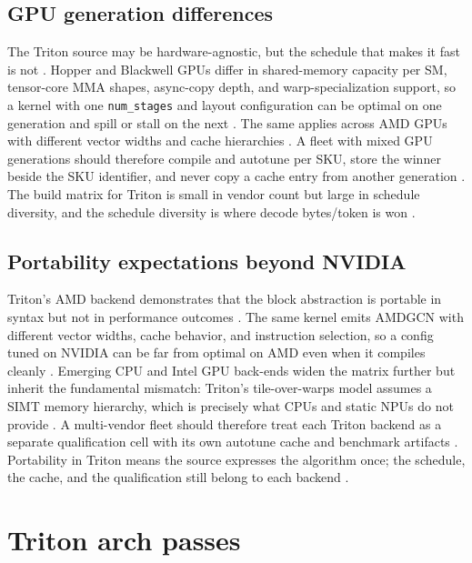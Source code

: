 \subsection{GPU generation differences}

The Triton source may be hardware-agnostic, but the schedule that makes it fast is not \citep{tritonlang2024,nvidia2022hopper}. Hopper and Blackwell GPUs differ in shared-memory capacity per SM, tensor-core MMA shapes, async-copy depth, and warp-specialization support, so a kernel with one \texttt{num\_stages} and layout configuration can be optimal on one generation and spill or stall on the next \citep{semianalysis2024tma,nvidia2022hopper}. The same applies across AMD GPUs with different vector widths and cache hierarchies \citep{tritonlang2024}. A fleet with mixed GPU generations should therefore compile and autotune per SKU, store the winner beside the SKU identifier, and never copy a cache entry from another generation \citep{memoryfloor2026,patel2025llminference}. The build matrix for Triton is small in vendor count but large in schedule diversity, and the schedule diversity is where decode bytes/token is won \citep{taxbreak2026,memoryfloor2026}.

\subsection{Portability expectations beyond NVIDIA}

Triton's AMD backend demonstrates that the block abstraction is portable in syntax but not in performance outcomes \citep{tritonlang2024}. The same kernel emits AMDGCN with different vector widths, cache behavior, and instruction selection, so a config tuned on NVIDIA can be far from optimal on AMD even when it compiles cleanly \citep{tritonlang2024,dlbook}. Emerging CPU and Intel GPU back-ends widen the matrix further but inherit the fundamental mismatch: Triton's tile-over-warps model assumes a SIMT memory hierarchy, which is precisely what CPUs and static NPUs do not provide \citep{amd2024xdna,dlbook}. A multi-vendor fleet should therefore treat each Triton backend as a separate qualification cell with its own autotune cache and benchmark artifacts \citep{patel2025llminference,memoryfloor2026}. Portability in Triton means the source expresses the algorithm once; the schedule, the cache, and the qualification still belong to each backend \citep{tillet2019triton,taxbreak2026}.

\section{Triton arch passes}
\label{sec:ch17_triton_arch_passes}

